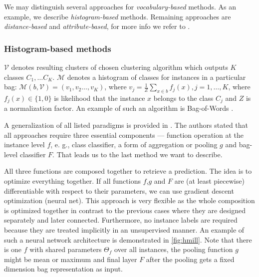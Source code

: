 We may distinguish several approaches for \emph{vocabulary-based} methods. As an example, we describe \emph{histogram-based} methods. Remaining approaches are \emph{distance-based} and \emph{attribute-based}, for more info we refer to \cite{Amores2013}.

\subsubsection{Histogram-based methods}
$\mathcal{V}$ denotes resulting clusters of chosen clustering algorithm which outputs $K$ classes $C_1,\dots C_K$. $\mathcal{M}$ denotes a histogram of classes for instances in a particular bag: $\mathcal{M}(b,\mathcal{V})=(v_1,v_2\dots,v_K)$, where $v_j=\frac{1}{Z}\sum_{x\in b}f_{j}(x), j=1,\dots,K$, where $f_{j}(x) \in \{1,0\}$ is likelihood that the instance $x$ belongs to the class $C_j$ and $Z$ is a normalization factor. An example of such an algorithm is Bag-of-Words \cite{Nowak2006}.

\hfill \break
A generalization of all listed paradigms is provided in \cite{Mandlik2020}. The authors stated that all approaches require three essential components --- function operation at the instance level $f$, e. g., class classifier, a form of aggregation or pooling $g$ and bag-level classifier $F$. That leads us to the last method we want to describe.

All three functions are composed together to retrieve a prediction. The idea is to optimize everything together. If all functions $f$,$g$ and $F$ are (at least piecewise) differentiable with respect to their parameters, we can use gradient descent optimization (neural net). \cite{Pevny2016a, Edwards2017} This approach is very flexible as the whole composition is optimized together in contrast to the previous cases where they are designed separately and later connected. Furthermore, no instance labels are required because they are treated implicitly in an unsupervised manner. An example of such a neural network architecture is demonstrated in \ref{fig:hmill}. Note that there is one $f$ with shared parameters $\Theta_{f}$ over all instances, the pooling function $g$ might be mean or maximum and final layer $F$ after the pooling gets a fixed dimension bag representation as input.

